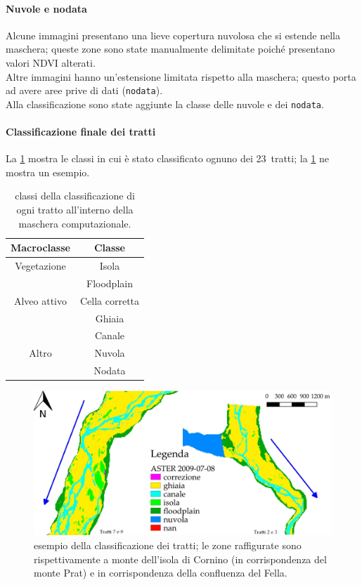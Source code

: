 \paragraph{Nuvole e nodata}
Alcune immagini presentano una lieve copertura nuvolosa che si estende nella maschera; queste zone sono state manualmente delimitate poiché presentano valori NDVI alterati.
\\
Altre immagini hanno un'estensione limitata rispetto alla maschera; questo porta ad avere aree prive di dati (\texttt{nodata}).
\\
Alla classificazione sono state aggiunte la classe delle nuvole e dei \texttt{nodata}.
%
%
\paragraph{Classificazione finale dei tratti}
La \cref{tab:class-tratti} mostra le classi in cui è stato classificato ognuno dei 23~tratti; la \cref{fig:class-is-fl} ne mostra un esempio.
%
\begin{table}[ht]
	\centering
	\begin{tabular}{
		c 
		c
		}
		\toprule
		\textbf{Macroclasse}	&	\textbf{Classe}	\\
		\midrule
		Vegetazione		&	Isola	\\
						&	Floodplain	\\
		\midrule
		Alveo attivo	&	Cella corretta	\\
						&	Ghiaia	\\
						&	Canale	\\
		\midrule
		Altro			&	Nuvola	\\
						&	Nodata	\\
		\bottomrule
	\end{tabular}
	\caption[classi della classificazione dei tratti]{classi della classificazione di ogni tratto all'interno della maschera computazionale.}
	\label{tab:class-tratti}
\end{table}
%
\begin{figure}[ht]
	\centering
	\includegraphics[width=\textwidth]{files/esempio_class_is_fl.jpeg}
	\caption[esempio della classificazione dei tratti]{esempio della classificazione dei tratti; le zone raffigurate sono rispettivamente a monte dell'isola di Cornino (in corrispondenza del monte Prat) e in corrispondenza della confluenza del Fella.}
	\label{fig:class-is-fl}
\end{figure}
%
%
%
